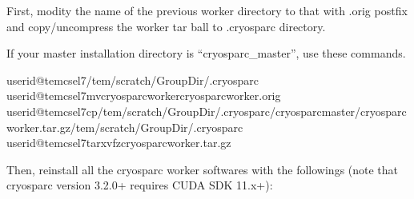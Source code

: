 \documentclass[a4paper,11pt,english]{sphinxmanual}
\begin{document}
\sphinxAtStartPar
First, modity the name of the previous worker directory to that with .orig postfix and copy/uncompress the worker tar ball to .cryosparc directory.

\sphinxAtStartPar
If your master installation directory is “cryosparc\_master”, use these commands.

\begin{sphinxVerbatim}[commandchars=\\\{\}]
userid@tem\PYGZhy{}cs\PYGZhy{}el7\PYGZdl{}\PYGZgt{}/tem/scratch/\PYGZlt{}GroupDir\PYGZgt{}/.cryosparc
userid@tem\PYGZhy{}cs\PYGZhy{}el7\PYGZdl{}\PYGZgt{}mvcryosparc\PYGZus{}workercryosparc\PYGZus{}worker.orig
userid@tem\PYGZhy{}cs\PYGZhy{}el7\PYGZdl{}\PYGZgt{}cp/tem/scratch/\PYGZlt{}GroupDir\PYGZgt{}/.cryosparc/cryosparc\PYGZus{}master/cryosparc\PYGZus{}worker.tar.gz/tem/scratch/\PYGZlt{}GroupDir\PYGZgt{}/.cryosparc
userid@tem\PYGZhy{}cs\PYGZhy{}el7\PYGZdl{}\PYGZgt{}tarxvfzcryosparc\PYGZus{}worker.tar.gz
\end{sphinxVerbatim}

\sphinxAtStartPar
Then, re\sphinxhyphen{}install all the cryosparc worker softwares with the followings (note that cryosparc version 3.2.0+ requires CUDA SDK 11.x+):
\end{document}
